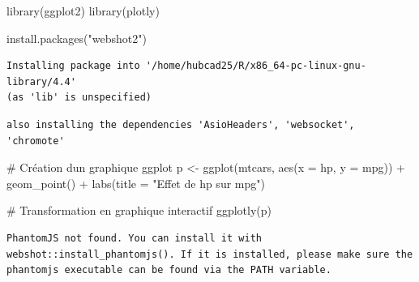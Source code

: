 \documentclass[
  letterpaper,
  DIV=11,
  numbers=noendperiod]{scrreprt}
\newenvironment{Shaded}{\begin{snugshade}}{\end{snugshade}}
\newcommand{\AttributeTok}[1]{\textcolor[rgb]{0.40,0.45,0.13}{#1}}
\newcommand{\CommentTok}[1]{\textcolor[rgb]{0.37,0.37,0.37}{#1}}
\newcommand{\FunctionTok}[1]{\textcolor[rgb]{0.28,0.35,0.67}{#1}}
\newcommand{\NormalTok}[1]{\textcolor[rgb]{0.00,0.23,0.31}{#1}}
\newcommand{\OtherTok}[1]{\textcolor[rgb]{0.00,0.23,0.31}{#1}}
\newcommand{\SpecialCharTok}[1]{\textcolor[rgb]{0.37,0.37,0.37}{#1}}
\newcommand{\StringTok}[1]{\textcolor[rgb]{0.13,0.47,0.30}{#1}}
\begin{document}
\begin{Shaded}
\begin{Highlighting}[]
\FunctionTok{library}\NormalTok{(ggplot2)}
\FunctionTok{library}\NormalTok{(plotly)}
\end{Highlighting}
\end{Shaded}

\begin{Shaded}
\begin{Highlighting}[]
\FunctionTok{install.packages}\NormalTok{(}\StringTok{"webshot2"}\NormalTok{)}
\end{Highlighting}
\end{Shaded}

\begin{verbatim}
Installing package into '/home/hubcad25/R/x86_64-pc-linux-gnu-library/4.4'
(as 'lib' is unspecified)
\end{verbatim}

\begin{verbatim}
also installing the dependencies 'AsioHeaders', 'websocket', 'chromote'
\end{verbatim}

\begin{Shaded}
\begin{Highlighting}[]
\CommentTok{\# Création d\textquotesingle{}un graphique ggplot}
\NormalTok{p }\OtherTok{\textless{}{-}} \FunctionTok{ggplot}\NormalTok{(mtcars, }\FunctionTok{aes}\NormalTok{(}\AttributeTok{x =}\NormalTok{ hp, }\AttributeTok{y =}\NormalTok{ mpg)) }\SpecialCharTok{+}
  \FunctionTok{geom\_point}\NormalTok{() }\SpecialCharTok{+}
  \FunctionTok{labs}\NormalTok{(}\AttributeTok{title =} \StringTok{"Effet de hp sur mpg"}\NormalTok{)}

\CommentTok{\# Transformation en graphique interactif}
\FunctionTok{ggplotly}\NormalTok{(p)}
\end{Highlighting}
\end{Shaded}

\begin{verbatim}
PhantomJS not found. You can install it with webshot::install_phantomjs(). If it is installed, please make sure the phantomjs executable can be found via the PATH variable.
\end{verbatim}
\end{document}
